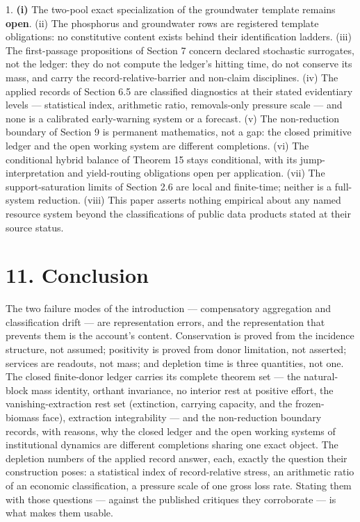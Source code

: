 \documentclass[11pt]{article}
\begin{document}
1. \textbf{(i)} The two-pool exact specialization of the groundwater template remains \textbf{open}. (ii) The phosphorus and groundwater rows are registered template obligations: no constitutive content exists behind their identification ladders. (iii) The first-passage propositions of Section 7 concern declared stochastic surrogates, not the ledger: they do not compute the ledger's hitting time, do not conserve its mass, and carry the record-relative-barrier and non-claim disciplines. (iv) The applied records of Section 6.5 are classified diagnostics at their stated evidentiary levels --- statistical index, arithmetic ratio, removals-only pressure scale --- and none is a calibrated early-warning system or a forecast. (v) The non-reduction boundary of Section 9 is permanent mathematics, not a gap: the closed primitive ledger and the open working system are different completions. (vi) The conditional hybrid balance of Theorem 15 stays conditional, with its jump-interpretation and yield-routing obligations open per application. (vii) The support-saturation limits of Section 2.6 are local and finite-time; neither is a full-system reduction. (viii) This paper asserts nothing empirical about any named resource system beyond the classifications of public data products stated at their source status.

\vspace{0.8em}

\section*{11. Conclusion}\label{11-conclusion}

The two failure modes of the introduction --- compensatory aggregation and classification drift --- are representation errors, and the representation that prevents them is the account's content. Conservation is proved from the incidence structure, not assumed; positivity is proved from donor limitation, not asserted; services are readouts, not mass; and depletion time is three quantities, not one. The closed finite-donor ledger carries its complete theorem set --- the natural-block mass identity, orthant invariance, no interior rest at positive effort, the vanishing-extraction rest set (extinction, carrying capacity, and the frozen-biomass face), extraction integrability --- and the non-reduction boundary records, with reasons, why the closed ledger and the open working systems of institutional dynamics are different completions sharing one exact object. The depletion numbers of the applied record answer, each, exactly the question their construction poses: a statistical index of record-relative stress, an arithmetic ratio of an economic classification, a pressure scale of one gross loss rate. Stating them with those questions --- against the published critiques they corroborate --- is what makes them usable.
\end{document}
